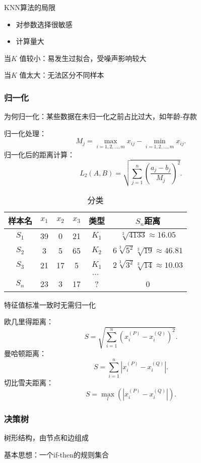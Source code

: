KNN算法的局限
\begin{itemize}
    \item 对参数选择很敏感
    \item 计算量大
\end{itemize}
当$K$ 值较小：易发生过拟合，受噪声影响较大

当$K$ 值太大：无法区分不同样本
\subsubsection{归一化}%
\label{subsub:归一化}
\begin{notation}
    为何归一化：某些数据在未归一化之前占比过大，如年龄-存款
\end{notation}
归一化处理：
\[
    M_j=\underset{i=1,2,\ldots ,m}{\max}x_{ij}-\underset{i=1,2,\ldots ,m}{\min}x_{ij}
.\]
归一化后的距离计算：
\[
    L_2\left( A,B \right) =\sqrt{\sum_{j=1}^{n} \left( \frac{a_j-b_j}{M_j} \right) ^2 } 
.\] 
\begin{table}[htpb]
    \centering
    \caption{分类}
    \label{tab:分类}
    \begin{tabular}{|c|c|c|c|c|c|}
    \hline
    样本名 & $x_1$ & $x_2$ & $x_3$ & 类型 & $S_n$距离 \\
    \hline
    $S_1$ & 39 & 0 & 21 & $K_1$ & $\sqrt[3]{4133}\approx 16.05 $\\
    \hline
    $S_2$ & 3 & 5 & 65 & $K_2$ & $6\sqrt[3]{5^2} \sqrt[3]{19}\approx 46.81 $\\
    \hline
    $S_3$ & 21 & 17 & 5 & $K_1$ & $2\sqrt[3]{3^2} \sqrt[3]{14}\approx 10.03 $\\
    \hline
    \multicolumn{6}{|c|}{$\ldots $} \\
    \hline
    $S_n$ & 23 & 3 & 17 & ? & 0\\
    \hline
    \end{tabular}
\end{table}
特征值标准一致时无需归一化
\begin{notation}
    欧几里得距离：\[
        S=\sqrt{\sum_{i=1}^{n} \left( x_{i}^{(P)}-x_{i}^{(Q)} \right) ^2} 
    .\] 
    曼哈顿距离：\[
        S=\sum_{i=1}^{n} \left| x_{i}^{(P)}-x_{i}^{(Q)} \right| 
    .\] 
    切比雪夫距离：\[
        S=\underset{l}{\max}\left( \left| x_{i}^{(P)}-x_{i}^{(Q)} \right|  \right) 
    .\] 
\end{notation}
\subsubsection{决策树}%
\label{subsub:决策树}
\begin{defi}
    树形结构，由节点和边组成
\end{defi}
基本思想：一个if-then的规则集合

